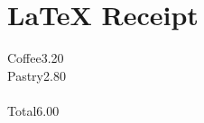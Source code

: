 \documentclass{article}
\begin{document}
\small
\section*{LaTeX Receipt}
Coffee\hfill 3.20\\
Pastry\hfill 2.80\\
\hrulefill\\
Total\hfill 6.00
\end{document}
